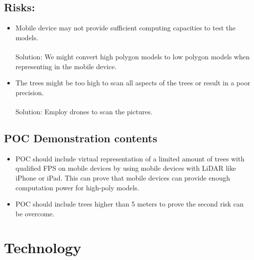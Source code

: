 \documentclass{article}
\begin{document}
\subsection{Risks:}
\begin{itemize}
    \item Mobile device may not provide sufficient computing capacities to test the models.\\\\ 
        Solution: We might convert high polygon models to low polygon models when representing in the mobile device. 
        
    \item The trees might be too high to scan all aspects of the trees or result in a poor precision.\\\\
        Solution: Employ drones to scan the pictures.
\end{itemize}

\subsection{POC Demonstration contents}
\begin{itemize}
    \item POC should include virtual representation of a limited amount
    of trees with qualified FPS on mobile 
    devices by using mobile devices with LiDAR like iPhone or iPad. 
    This can prove that mobile devices can provide enough computation power for high-poly models.
    \item POC should include trees higher than 5 meters to prove the second risk can be
    overcome.
\end{itemize}
\section{Technology}
\end{document}
